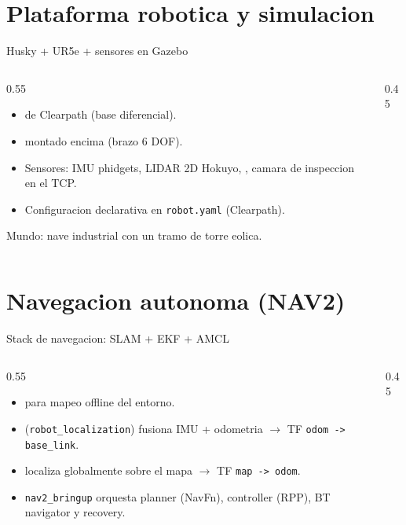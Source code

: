 \documentclass[10pt,aspectratio=169]{beamer}
\begin{document}
\section{Plataforma robotica y simulacion}

\begin{frame}{Husky + UR5e + sensores en Gazebo}
  \begin{columns}
    \begin{column}{0.55\textwidth}
      \begin{itemize}
        \item {} de Clearpath (base diferencial).
        \item {} montado encima (brazo 6 DOF).
        \item Sensores: IMU phidgets, LIDAR 2D Hokuyo, , camara de inspeccion en el TCP.
        \item Configuracion declarativa en \texttt{robot.yaml} (Clearpath).
      \end{itemize}
      \vspace{0.5em}
      Mundo: nave industrial con un tramo de torre eolica.
    \end{column}
    \begin{column}{0.45\textwidth}
    \end{column}
  \end{columns}
\end{frame}

\section{Navegacion autonoma (NAV2)}

\begin{frame}{Stack de navegacion: SLAM + EKF + AMCL}
  \begin{columns}
    \begin{column}{0.55\textwidth}
      \begin{itemize}
        \item {} para mapeo offline del entorno.
        \item {} (\texttt{robot\_localization}) fusiona IMU + odometria $\to$ TF \texttt{odom -> base\_link}.
        \item {} localiza globalmente sobre el mapa $\to$ TF \texttt{map -> odom}.
        \item \texttt{nav2\_bringup} orquesta planner (NavFn), controller (RPP), BT navigator y recovery.
      \end{itemize}
    \end{column}
    \begin{column}{0.45\textwidth}
    \end{column}
  \end{columns}
\end{frame}
\end{document}
